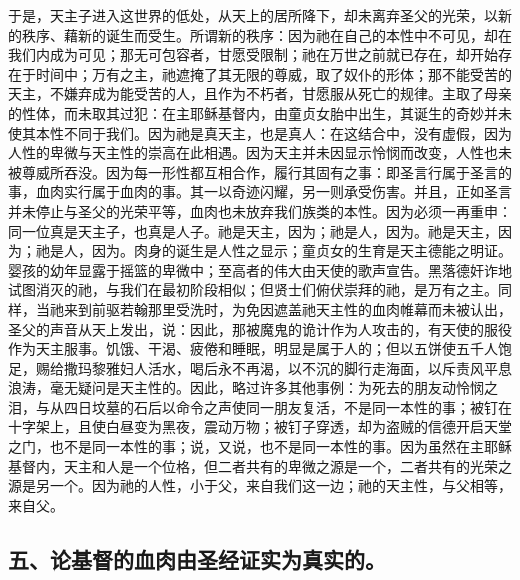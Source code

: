 于是，天主子进入这世界的低处，从天上的居所降下，却未离弃圣父的光荣，以新的秩序、藉新的诞生而受生。所谓新的秩序：因为祂在自己的本性中不可见，却在我们内成为可见；那无可包容者，甘愿受限制；祂在万世之前就已存在，却开始存在于时间中；万有之主，祂遮掩了其无限的尊威，取了奴仆的形体；那不能受苦的天主，不嫌弃成为能受苦的人，且作为不朽者，甘愿服从死亡的规律。主取了母亲的性体，而未取其过犯：在主耶稣基督内，由童贞女胎中出生，其诞生的奇妙并未使其本性不同于我们。因为祂是真天主，也是真人：在这结合中，没有虚假，因为人性的卑微与天主性的崇高在此相遇。因为天主并未因显示怜悯而改变，人性也未被尊威所吞没。因为每一形性都互相合作，履行其固有之事：即圣言行属于圣言的事，血肉实行属于血肉的事。其一以奇迹闪耀，另一则承受伤害。并且，正如圣言并未停止与圣父的光荣平等，血肉也未放弃我们族类的本性。因为必须一再重申：同一位真是天主子，也真是人子。祂是天主，因为；祂是人，因为。祂是天主，因为；祂是人，因为。肉身的诞生是人性之显示；童贞女的生育是天主德能之明证。婴孩的幼年显露于摇篮的卑微中；至高者的伟大由天使的歌声宣告。黑落德奸诈地试图消灭的祂，与我们在最初阶段相似；但贤士们俯伏崇拜的祂，是万有之主。同样，当祂来到前驱若翰那里受洗时，为免因遮盖祂天主性的血肉帷幕而未被认出，圣父的声音从天上发出，说：因此，那被魔鬼的诡计作为人攻击的，有天使的服役作为天主服事。饥饿、干渴、疲倦和睡眠，明显是属于人的；但以五饼使五千人饱足，赐给撒玛黎雅妇人活水，喝后永不再渴，以不沉的脚行走海面，以斥责风平息浪涛，毫无疑问是天主性的。因此，略过许多其他事例：为死去的朋友动怜悯之泪，与从四日坟墓的石后以命令之声使同一朋友复活，不是同一本性的事；被钉在十字架上，且使白昼变为黑夜，震动万物；被钉子穿透，却为盗贼的信德开启天堂之门，也不是同一本性的事；说，又说，也不是同一本性的事。因为虽然在主耶稣基督内，天主和人是一个位格，但二者共有的卑微之源是一个，二者共有的光荣之源是另一个。因为祂的人性，小于父，来自我们这一边；祂的天主性，与父相等，来自父。\par


\subsection{五、论基督的血肉由圣经证实为真实的。}

